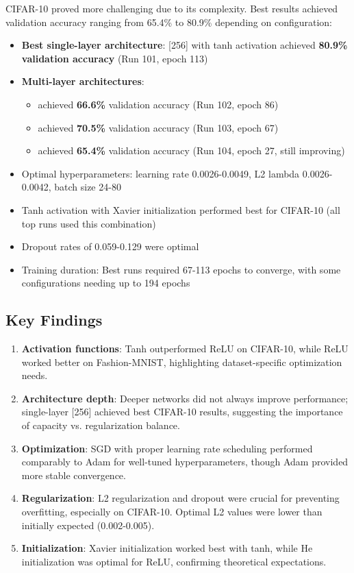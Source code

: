 \documentclass[11pt,a4paper]{article}
\begin{document}
CIFAR-10 proved more challenging due to its complexity. Best results achieved validation accuracy ranging from 65.4\% to 80.9\% depending on configuration:
\begin{itemize}
\item \textbf{Best single-layer architecture}: [256] with tanh activation achieved \textbf{80.9\% validation accuracy} (Run 101, epoch 113)
\item \textbf{Multi-layer architectures}: 
  \begin{itemize}
  \item [128,64] achieved \textbf{66.6\%} validation accuracy (Run 102, epoch 86)
  \item [256,128] achieved \textbf{70.5\%} validation accuracy (Run 103, epoch 67)
  \item [512,256] achieved \textbf{65.4\%} validation accuracy (Run 104, epoch 27, still improving)
  \end{itemize}
\item Optimal hyperparameters: learning rate 0.0026-0.0049, L2 lambda 0.0026-0.0042, batch size 24-80
\item Tanh activation with Xavier initialization performed best for CIFAR-10 (all top runs used this combination)
\item Dropout rates of 0.059-0.129 were optimal
\item Training duration: Best runs required 67-113 epochs to converge, with some configurations needing up to 194 epochs
\end{itemize}

\subsection{Key Findings}

\begin{enumerate}
\item \textbf{Activation functions}: Tanh outperformed ReLU on CIFAR-10, while ReLU worked better on Fashion-MNIST, highlighting dataset-specific optimization needs.

\item \textbf{Architecture depth}: Deeper networks did not always improve performance; single-layer [256] achieved best CIFAR-10 results, suggesting the importance of capacity vs. regularization balance.

\item \textbf{Optimization}: SGD with proper learning rate scheduling performed comparably to Adam for well-tuned hyperparameters, though Adam provided more stable convergence.

\item \textbf{Regularization}: L2 regularization and dropout were crucial for preventing overfitting, especially on CIFAR-10. Optimal L2 values were lower than initially expected (0.002-0.005).

\item \textbf{Initialization}: Xavier initialization worked best with tanh, while He initialization was optimal for ReLU, confirming theoretical expectations.
\end{enumerate}
\end{document}
